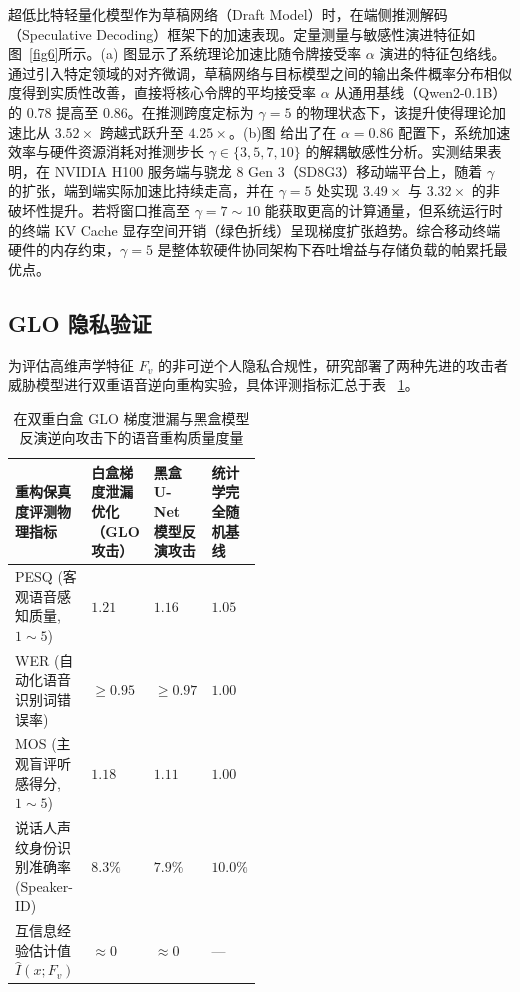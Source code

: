 \documentclass[11pt, a4paper]{article}
\begin{document}
超低比特轻量化模型作为草稿网络（Draft Model）时，在端侧推测解码（Speculative Decoding）框架下的加速表现。定量测量与敏感性演进特征如图~\ref{fig6}所示。(a) 图显示了系统理论加速比随令牌接受率 $\alpha$ 演进的特征包络线。通过引入特定领域的对齐微调，草稿网络与目标模型之间的输出条件概率分布相似度得到实质性改善，直接将核心令牌的平均接受率 $\alpha$ 从通用基线（Qwen2-0.1B）的 $0.78$ 提高至 $0.86$。在推测跨度定标为 $\gamma = 5$ 的物理状态下，该提升使得理论加速比从 $3.52\times$ 跨越式跃升至 $4.25\times$。(b)图 给出了在 $\alpha = 0.86$ 配置下，系统加速效率与硬件资源消耗对推测步长 $\gamma \in \{3, 5, 7, 10\}$ 的解耦敏感性分析。实测结果表明，在 NVIDIA H100 服务端与骁龙 8 Gen 3（SD8G3）移动端平台上，随着 $\gamma$ 的扩张，端到端实际加速比持续走高，并在 $\gamma = 5$ 处实现 $3.49\times$ 与 $3.32\times$ 的非破坏性提升。若将窗口推高至 $\gamma = 7 \sim 10$ 能获取更高的计算通量，但系统运行时的终端 KV Cache 显存空间开销（绿色折线）呈现梯度扩张趋势。综合移动终端硬件的内存约束，$\gamma = 5$ 是整体软硬件协同架构下吞吐增益与存储负载的帕累托最优点。


\subsection{ GLO 隐私验证}

为评估高维声学特征 $F_v$ 的非可逆个人隐私合规性，研究部署了两种先进的攻击者威胁模型进行双重语音逆向重构实验，具体评测指标汇总于表
~\ref{tab:privacy_attack}。

\begin{table}[htbp]
\centering
\caption{在双重白盒 GLO 梯度泄漏与黑盒模型反演逆向攻击下的语音重构质量度量}
\label{tab:privacy_attack}
\small
\renewcommand{\arraystretch}{1.25}
\begin{tabular}{l>{\centering\arraybackslash}p{0.17\linewidth}>{\centering\arraybackslash}p{0.16\linewidth}>{\centering\arraybackslash}p{0.16\linewidth}}
\toprule
\textbf{重构保真度评测物理指标} & \textbf{白盒梯度泄漏优化（GLO 攻击）} & \textbf{黑盒 U-Net 模型反演攻击} & \textbf{统计学完全随机基线} \\
\midrule
PESQ (客观语音感知质量, $1 \sim 5$) & $1.21$ & $1.16$ & $1.05$ \\
WER (自动化语音识别词错误率) & $\ge 0.95$ & $\ge 0.97$ & $1.00$ \\
MOS (主观盲评听感得分, $1 \sim 5$)& $1.18$ & $1.11$ & $1.00$ \\
说话人声纹身份识别准确率 (Speaker-ID) & $8.3\%$ & $7.9\%$ & $10.0\%$ \\
互信息经验估计值 $\hat{I}(x; F_v)$ & $\approx 0$ & $\approx 0$ & — \\
\bottomrule
\end{tabular}
\end{table}
\end{document}
